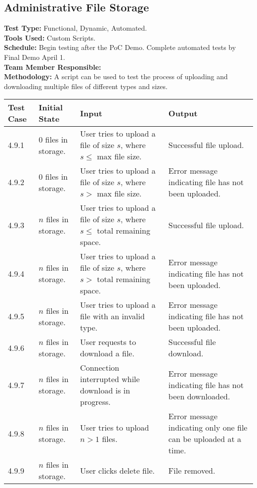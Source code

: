 \documentclass[12pt]{article}
\begin{document}
\subsection{Administrative File Storage}
\textbf{Test Type:} Functional, Dynamic, Automated. \\
\textbf{Tools Used:} Custom Scripts. \\
\textbf{Schedule:} Begin testing after the PoC Demo. Complete automated tests by Final Demo April 1. \\
\textbf{Team Member Responsible:} \\
\textbf{Methodology:} A script can be used to test the process of uploading and downloading multiple files of different types and sizes.

\begin{longtable}{|p{2cm}|p{3cm}|p{5cm}|p{5cm}|}
\hline
\textbf{Test Case} & \textbf{Initial State} & \textbf{Input} & \textbf{Output} \\ \hline
4.9.1 & 0 files in storage. & User tries to upload a file of size $s$, where $s \le$ max file size. & Successful file upload.\\
\hline
4.9.2 & 0 files in storage. & User tries to upload a file of size $s$, where $s >$ max file size. & Error message indicating file has not been uploaded.\\
\hline
4.9.3 & $n$ files in storage. & User tries to upload a file of size $s$, where $s \le$ total remaining space. & Successful file upload.\\
\hline
4.9.4 & $n$ files in storage. & User tries to upload a file of size $s$, where $s >$ total remaining space. & Error message indicating file has not been uploaded.\\
\hline
4.9.5 & $n$ files in storage. & User tries to upload a file with an invalid type. & Error message indicating file has not been uploaded.\\
\hline
4.9.6 & $n$ files in storage. & User requests to download a file. & Successful file download.\\
\hline
4.9.7 & $n$ files in storage. & Connection interrupted while download is in progress. & Error message indicating file has not been downloaded.\\
\hline
4.9.8 & $n$ files in storage. & User tries to upload  $n > 1$ files. & Error message indicating only one file can be uploaded at a time.\\
\hline
4.9.9 & $n$ files in storage. & User clicks delete file. & File removed. \\
\hline
\end{longtable}
\end{document}
